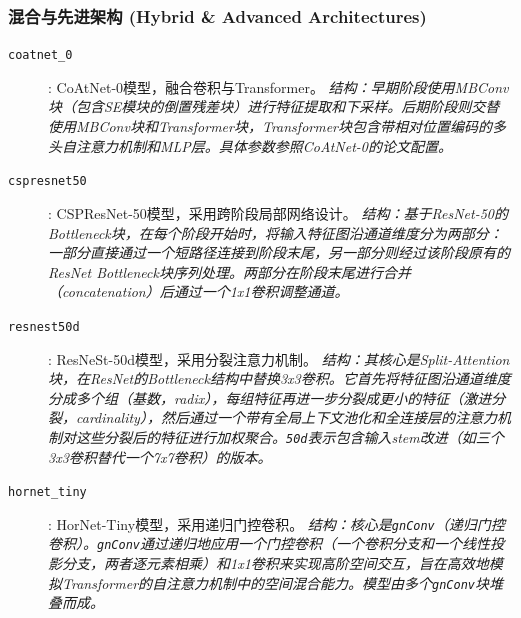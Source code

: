 \documentclass[a4paper]{article}
\begin{document}
\subsubsection{混合与先进架构 (Hybrid \& Advanced Architectures)}
\begin{description}
    \item[\texttt{coatnet\_0}]: CoAtNet-0模型，融合卷积与Transformer。 \textit{结构：早期阶段使用MBConv块（包含SE模块的倒置残差块）进行特征提取和下采样。后期阶段则交替使用MBConv块和Transformer块，Transformer块包含带相对位置编码的多头自注意力机制和MLP层。具体参数参照CoAtNet-0的论文配置。}
    \item[\texttt{cspresnet50}]: CSPResNet-50模型，采用跨阶段局部网络设计。 \textit{结构：基于ResNet-50的Bottleneck块，在每个阶段开始时，将输入特征图沿通道维度分为两部分：一部分直接通过一个短路径连接到阶段末尾，另一部分则经过该阶段原有的ResNet Bottleneck块序列处理。两部分在阶段末尾进行合并（concatenation）后通过一个1x1卷积调整通道。}
    \item[\texttt{resnest50d}]: ResNeSt-50d模型，采用分裂注意力机制。 \textit{结构：其核心是Split-Attention块，在ResNet的Bottleneck结构中替换3x3卷积。它首先将特征图沿通道维度分成多个组（基数，radix），每组特征再进一步分裂成更小的特征（激进分裂，cardinality），然后通过一个带有全局上下文池化和全连接层的注意力机制对这些分裂后的特征进行加权聚合。\texttt{50d}表示包含输入stem改进（如三个3x3卷积替代一个7x7卷积）的版本。}
    \item[\texttt{hornet\_tiny}]: HorNet-Tiny模型，采用递归门控卷积。 \textit{结构：核心是\texttt{gnConv}（递归门控卷积）。\texttt{gnConv}通过递归地应用一个门控卷积（一个卷积分支和一个线性投影分支，两者逐元素相乘）和1x1卷积来实现高阶空间交互，旨在高效地模拟Transformer的自注意力机制中的空间混合能力。模型由多个\texttt{gnConv}块堆叠而成。}
\end{description}
\end{document}
